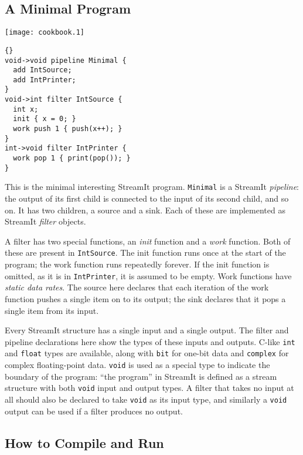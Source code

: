 \smallskip \subsection{A Minimal Program}

\begin{textpic}{\texttt{[image: cookbook.1]}}
\begin{lstlisting}{}
void->void pipeline Minimal {
  add IntSource;
  add IntPrinter;
}
void->int filter IntSource {
  int x;
  init { x = 0; }
  work push 1 { push(x++); }
}
int->void filter IntPrinter {
  work pop 1 { print(pop()); }
}
\end{lstlisting}
\end{textpic}

This is the minimal interesting StreamIt program.  \lstinline|Minimal|
is a StreamIt \emph{pipeline}: the output of its first child is
connected to the input of its second child, and so on.  It has two
children, a source and a sink.  Each of these are implemented as
StreamIt \emph{filter} objects.

A filter has two special functions, an \emph{init} function and a
\emph{work} function.  Both of these are present in
\lstinline|IntSource|.  The init function runs once at the start of
the program; the work function runs repeatedly forever.  If the init
function is omitted, as it is in \lstinline|IntPrinter|, it is assumed
to be empty.  Work functions have \emph{static data rates}.  The
source here declares that each iteration of the work function pushes a
single item on to its output; the sink declares that it pops a single
item from its input.

Every StreamIt structure has a single input and a single output.  The
filter and pipeline declarations here show the types of these inputs
and outputs.  C-like \lstinline|int| and \lstinline|float| types are
available, along with \lstinline|bit| for one-bit data and
\lstinline|complex| for complex floating-point data.  \lstinline|void|
is used as a special type to indicate the boundary of the program:
``the program'' in StreamIt is defined as a stream structure with both
\lstinline|void| input and output types.  A filter that takes no input
at all should also be declared to take \lstinline|void| as its input
type, and similarly a \lstinline|void| output can be used if a filter
produces no output.

\subsection*{How to Compile and Run}

